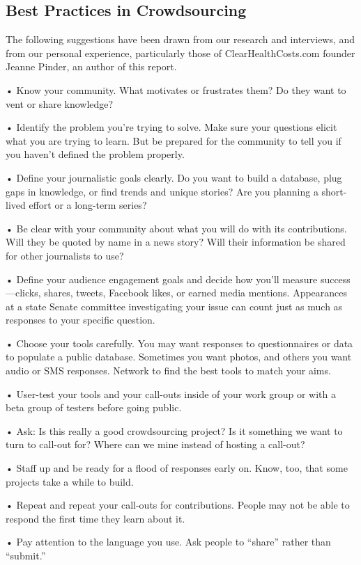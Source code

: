 \begin{itemize}
\begin{itemize}
\begin{enumerate}
{\section{Best Practices in Crowdsourcing} 

The following suggestions have been drawn from our research and interviews, and from our personal experience, particularly those of ClearHealthCosts.com founder Jeanne Pinder, an author of this report. 

• Know your community. What motivates or frustrates them? Do they want to vent or share knowledge?

• Identify the problem you’re trying to solve. Make sure your questions elicit what you are trying to learn. But be prepared for the community to tell you if you haven’t defined the problem properly.

• Define your journalistic goals clearly. Do you want to build a database, plug gaps in knowledge, or find trends and unique stories? Are you planning a short-lived effort or a long-term series?

• Be clear with your community about what you will do with its contributions. Will they be quoted by name in a news story? Will their information be shared for other journalists to use?

• Define your audience engagement goals and decide how you’ll measure success---clicks, shares, tweets, Facebook likes, or earned media mentions. Appearances at a state Senate committee investigating your issue can count just as much as responses to your specific question. 

• Choose your tools carefully. You may want responses to questionnaires or data to populate a public database. Sometimes you want photos, and others you want audio or SMS responses. Network to find the best tools to match your aims.

• User-test your tools and your call-outs inside of your work group or with a beta group of testers before going public.

• Ask: Is this really a good crowdsourcing project? Is it something we want to turn to call-out for? Where can we mine instead of hosting a call-out?

• Staff up and be ready for a flood of responses early on. Know, too, that some projects take a while to build. 

• Repeat and repeat your call-outs for contributions. People may not be able to respond the first time they learn about it.

• Pay attention to the language you use. Ask people to “share” rather than “submit.”

}
\end{enumerate}
\end{itemize}
\end{itemize}
